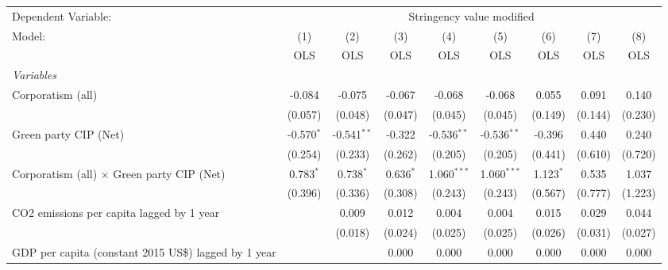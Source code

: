 
\begingroup
\centering
\begin{tabular}{lcccccccc}
   \toprule
   Dependent Variable: & \multicolumn{8}{c}{Stringency value modified}\\
   Model:                                                    & (1)          & (2)           & (3)         & (4)           & (5)           & (6)          & (7)     & (8)\\  
                                                             &  OLS         & OLS           & OLS         & OLS           & OLS           & OLS          & OLS     & OLS\\  
   \midrule
   \emph{Variables}\\
   Corporatism (all)                                         & -0.084       & -0.075        & -0.067      & -0.068        & -0.068        & 0.055        & 0.091   & 0.140\\   
                                                             & (0.057)      & (0.048)       & (0.047)     & (0.045)       & (0.045)       & (0.149)      & (0.144) & (0.230)\\   
   Green party CIP (Net)                                     & -0.570$^{*}$ & -0.541$^{**}$ & -0.322      & -0.536$^{**}$ & -0.536$^{**}$ & -0.396       & 0.440   & 0.240\\   
                                                             & (0.254)      & (0.233)       & (0.262)     & (0.205)       & (0.205)       & (0.441)      & (0.610) & (0.720)\\   
   Corporatism (all) $\times$ Green party CIP (Net)          & 0.783$^{*}$  & 0.738$^{*}$   & 0.636$^{*}$ & 1.060$^{***}$ & 1.060$^{***}$ & 1.123$^{*}$  & 0.535   & 1.037\\   
                                                             & (0.396)      & (0.336)       & (0.308)     & (0.243)       & (0.243)       & (0.567)      & (0.777) & (1.223)\\   
   CO2 emissions per capita lagged by 1 year                 &              & 0.009         & 0.012       & 0.004         & 0.004         & 0.015        & 0.029   & 0.044\\   
                                                             &              & (0.018)       & (0.024)     & (0.025)       & (0.025)       & (0.026)      & (0.031) & (0.027)\\   
   GDP per capita (constant 2015 US\$) lagged by 1 year      &              &               & 0.000       & 0.000         & 0.000         & 0.000        & 0.000   & 0.000\\   

\end{tabular}
